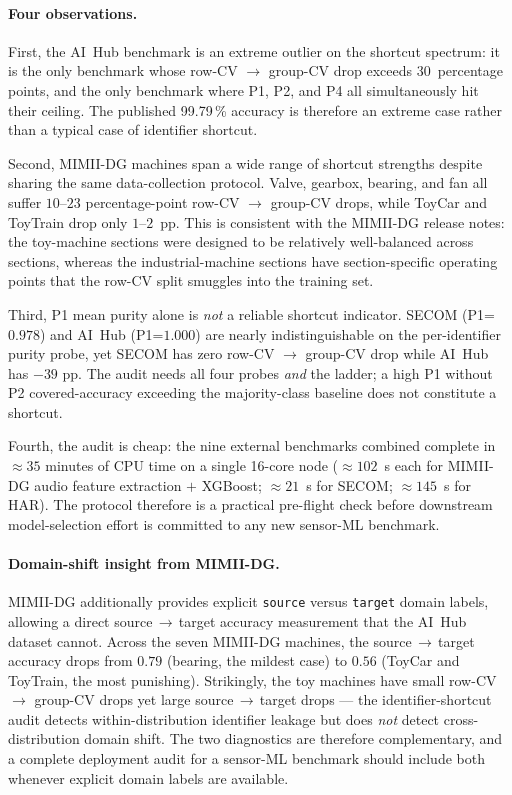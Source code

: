 \documentclass[3p,times,authoryear]{elsarticle}
\theoremstyle{remark}
\begin{document}
\paragraph{Four observations.}
First, the AI~Hub benchmark is an extreme outlier on the
shortcut spectrum: it is the only benchmark whose
row-CV $\to$ group-CV drop exceeds $30$~percentage points, and
the only benchmark where P1, P2, and P4 all simultaneously hit
their ceiling. The published 99.79\,\% accuracy is therefore
an extreme case rather than a typical case of identifier
shortcut.

Second, MIMII-DG machines span a wide range of shortcut
strengths despite sharing the same data-collection protocol.
Valve, gearbox, bearing, and fan all suffer $10$--$23$
percentage-point row-CV $\to$ group-CV drops, while ToyCar and
ToyTrain drop only $1$--$2$~pp. This is consistent with the
MIMII-DG release notes: the toy-machine sections were
designed to be relatively well-balanced across sections,
whereas the industrial-machine sections have section-specific
operating points that the row-CV split smuggles into the
training set.

Third, P1 mean purity alone is \emph{not} a reliable shortcut
indicator. SECOM (P1=$0.978$) and AI~Hub (P1=$1.000$) are
nearly indistinguishable on the per-identifier purity probe,
yet SECOM has zero row-CV $\to$ group-CV drop while AI~Hub has
$-39$ pp. The audit needs all four probes \emph{and} the
ladder; a high P1 without P2 covered-accuracy exceeding the
majority-class baseline does not constitute a shortcut.

Fourth, the audit is cheap: the nine external benchmarks
combined complete in $\approx 35$ minutes of CPU time on a
single 16-core node ($\approx 102$~s each for MIMII-DG audio
feature extraction $+$ XGBoost; $\approx 21$~s for SECOM;
$\approx 145$~s for HAR). The protocol therefore is a
practical pre-flight check before downstream model-selection
effort is committed to any new sensor-ML benchmark.

\paragraph{Domain-shift insight from MIMII-DG.}
MIMII-DG additionally provides explicit \texttt{source}
versus \texttt{target} domain labels, allowing a direct
source$\,\to\,$target accuracy measurement that the AI~Hub
dataset cannot. Across the seven MIMII-DG machines, the
source$\,\to\,$target accuracy drops from $0.79$ (bearing, the
mildest case) to $0.56$ (ToyCar and ToyTrain, the most punishing).
Strikingly, the toy machines have small row-CV $\to$ group-CV
drops yet large source$\,\to\,$target drops --- the
identifier-shortcut audit detects within-distribution
identifier leakage but does \emph{not} detect cross-distribution
domain shift. The two diagnostics are therefore complementary,
and a complete deployment audit for a sensor-ML benchmark
should include both whenever explicit domain labels are
available.
\end{document}
